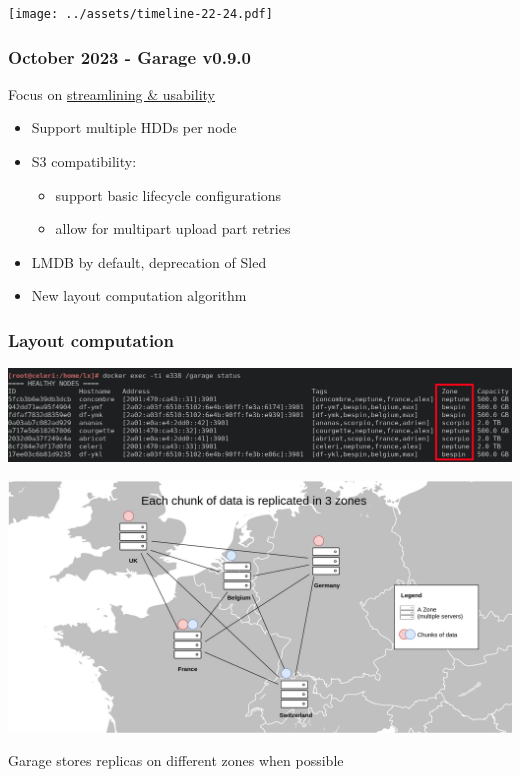 \documentclass[aspectratio=169,xcolor={svgnames}]{beamer}
\begin{document}

\begin{frame}
	\begin{center}
		\texttt{[image: ../assets/timeline-22-24.pdf]}
	\end{center}
\end{frame}

\begin{frame}
	\frametitle{October 2023 - Garage v0.9.0}
	Focus on \underline{streamlining \& usability}
	\vspace{2em}
	\begin{itemize}
		\item Support multiple HDDs per node
			\vspace{1em}
		\item S3 compatibility: 
			\vspace{1em}
			\begin{itemize}
				\item support basic lifecycle configurations
					\vspace{.5em}
				\item allow for multipart upload part retries
			\end{itemize}
			\vspace{1em}
		\item LMDB by default, deprecation of Sled
			\vspace{1em}
		\item New layout computation algorithm
	\end{itemize}
\end{frame}


\begin{frame}
	\frametitle{Layout computation}
	\begin{overprint}
		\begin{center}
			\includegraphics[width=\linewidth, trim=0 0 0 -4cm]{../assets/screenshots/garage_status_0.9_prod_zonehl.png}
		\end{center}
		\begin{center}
			\includegraphics[width=.7\linewidth]{../assets/map.png}
		\end{center}
	\end{overprint}
	\vspace{1em}
	Garage stores replicas on different zones when possible
\end{frame}
\end{document}
